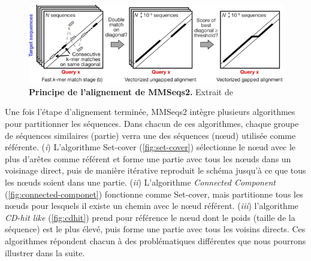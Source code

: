 \begin{figure}[htbp]
    \centering
    \includegraphics[width=\textwidth]{images/mmseqs2.png}
    \caption[Principe de l'alignement de MMSeqs2.]{\textbf{Principe de l'alignement de MMSeqs2.}  Extrait de \cite{steinegger_mmseqs2_2017}}
    \label{fig:mmseqs2}
\end{figure}

Une fois l'étape d'alignement terminée, MMSeqs2 intègre plusieurs algorithmes pour partitionner les séquences. Dans chacun de ces algorithmes, chaque groupe de séquences similaires (partie) verra une des séquences (n\oe ud) utilisée comme référente. (\textit{i}) L'algorithme Set-cover (\autoref{fig:set-cover}) sélectionne le n\oe ud avec le plus d'arêtes comme référent et forme une partie avec tous les n\oe uds dans un voisinage direct, puis de manière itérative reproduit le schéma jusqu'à ce que tous les n\oe uds soient dans une partie. (\textit{ii}) L'algorithme \textit{Connected Component} (\autoref{fig:connected-componet}) fonctionne comme Set-cover, mais partitionne tous les n\oe uds pour lesquels il existe un chemin avec le n\oe ud référent. (\textit{iii}) l'algorithme \textit{CD-hit like} (\autoref{fig:cdhit}) prend pour référence le n\oe ud dont le poids (taille de la séquence) est le plus élevé, puis forme une partie avec tous les voisins directs. Ces algorithmes répondent chacun à des problématiques différentes que nous pourrons illustrer dans la suite.  

